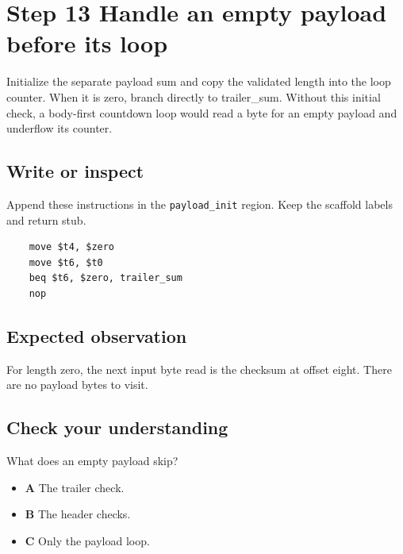 \section{Step 13 Handle an empty payload before its loop}\label{packet-s13}

Initialize the separate payload sum and copy the validated length into the loop counter. When it is zero, branch directly to trailer\_sum. Without this initial check, a body-first countdown loop would read a byte for an empty payload and underflow its counter.

\subsection{Write or inspect}
Append these instructions in the \texttt{payload\_init} region. Keep the scaffold labels and return stub.

\begin{verbatim}
    move $t4, $zero
    move $t6, $t0
    beq $t6, $zero, trailer_sum
    nop
\end{verbatim}

\subsection{Expected observation}
For length zero, the next input byte read is the checksum at offset eight. There are no payload bytes to visit.

\subsection{Check your understanding}
What does an empty payload skip?

\begin{itemize}
  \item \textbf{A} The trailer check.
  \item \textbf{B} The header checks.
  \item \textbf{C} Only the payload loop.
\end{itemize}
